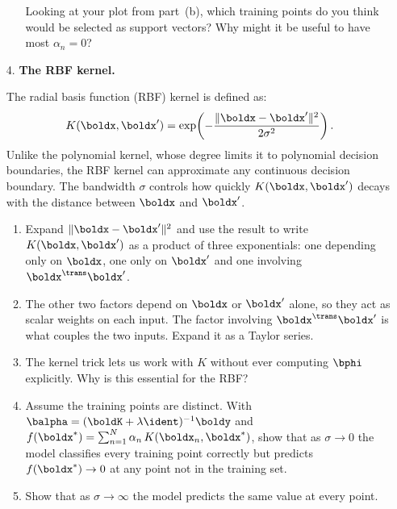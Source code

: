 \documentclass[submit]{harvardml}
\begin{document}
\begin{problem}
\begin{enumerate}
\begin{enumerate}
    Looking at your plot from part~(b), which training points do you
    think would be selected as support vectors? Why might it be
    useful to have most $\alpha_n = 0$?
  \end{enumerate}

  \item[4.] \textbf{The RBF kernel.}

  The radial basis function (RBF) kernel is defined as:
  \[
    K(\boldx, \boldx') = \exp\!\left(-\frac{\|\boldx - \boldx'\|^2}{2\sigma^2}\right).
  \]
  Unlike the polynomial kernel, whose degree limits it to polynomial
  decision boundaries, the RBF kernel can approximate any continuous
  decision boundary. The bandwidth $\sigma$ controls how quickly
  $K(\boldx, \boldx')$ decays with the distance between $\boldx$
  and $\boldx'$.

  \begin{enumerate}
    \item Expand $\|\boldx - \boldx'\|^2$ and use the result to write
    $K(\boldx, \boldx')$ as a product of three exponentials: one
    depending only on $\boldx$, one only on $\boldx'$ and one
    involving $\boldx^\trans \boldx'$.

    \item The other two factors depend on $\boldx$ or $\boldx'$ alone,
    so they act as scalar weights on each input. The factor involving
    $\boldx^\trans \boldx'$ is what couples the two inputs. Expand it
    as a Taylor series.

    \item The kernel trick lets us work with $K$ without ever
    computing $\bphi$ explicitly. Why is this essential for the RBF?

    \item Assume the training points are distinct. With
    $\balpha = (\boldK + \lambda \ident)^{-1} \boldy$ and
    $f(\boldx^*) = \sum_{n=1}^N \alpha_n \, K(\boldx_n, \boldx^*)$,
    show that as $\sigma \to 0$ the model classifies every training
    point correctly but predicts $f(\boldx^*) \to 0$ at any point
    not in the training set.

    \item Show that as $\sigma \to \infty$ the model predicts the
    same value at every point.
  \end{enumerate}

\end{enumerate}
\end{problem}

\newpage
\end{document}
